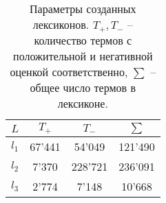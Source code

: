 \begin{table}[ht!]
\centering
\caption{Параметры созданных лексиконов.
    $T_+, T_-$ -- количество термов с положительной и негативной оценкой
    соответственно,
    $\sum$ -- общее число термов в лексиконе.}
\label{table:createdLexicons}
\begin{tabular}{cccc}
\hline
$L$      & $T_+$  & $T_-$   & $\sum$  \\ \hline
$l_1$    & 67'441 & 54'049  & 121'490 \\
$l_2$    & 7'370  & 228'721 & 236'091 \\
$l_3$    & 2'774  & 7'148   & 10'668  \\ \hline
\end{tabular}
\end{table}
